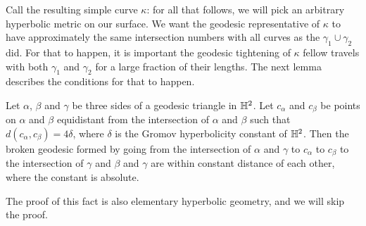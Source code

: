\documentclass[12pt, reqno]{amsart}
\begin{document}
Call the resulting simple curve $\kappa$: for all that follows, we will pick an arbitrary hyperbolic metric on our surface.
We want the geodesic representative of $\kappa$ to have approximately the same intersection numbers with all curves as the $\gamma_1 \cup \gamma_2$ did.
For that to happen, it is important the geodesic tightening of $\kappa$ fellow travels with both $\gamma_1$ and $\gamma_2$ for a large fraction of their lengths.
The next lemma describes the conditions for that to happen.
\begin{lemma}
  \label{lem:geodesic-tightening}
  Let $\alpha$, $\beta$ and $\gamma$ be three sides of a geodesic triangle in $\mathbb{H}^2$.
  Let $c_\alpha$ and $c_{\beta}$ be points on $\alpha$ and $\beta$ equidistant from the intersection of $\alpha$ and $\beta$ such that $d(c_\alpha, c_\beta) = 4 \delta$, where $\delta$ is the Gromov hyperbolicity constant of $\mathbb{H}^2$.
  Then the broken geodesic formed by going from the intersection of $\alpha$ and $\gamma$ to $c_{\alpha}$ to $c_{\beta}$ to the intersection of $\gamma$ and $\beta$ and $\gamma$ are within constant distance of each other, where the constant is absolute.
\end{lemma}
The proof of this fact is also elementary hyperbolic geometry, and we will skip the proof.
\end{document}
